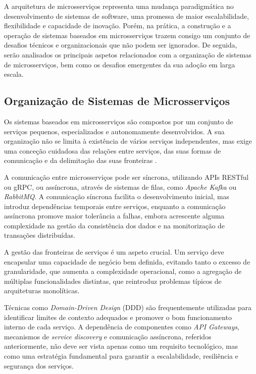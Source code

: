 A arquitetura de microsserviços representa uma mudança paradigmática no desenvolvimento de sistemas de software, uma promessa de maior escalabilidade, flexibilidade e capacidade de inovação. Porém, na prática, a construção e a operação de sistemas baseados em microsserviços trazem consigo um conjunto de desafios técnicos e organizacionais que não podem ser ignorados. De seguida, serão analisados os principais aspetos relacionados com a organização de sistemas de microsserviços, bem como os desafios emergentes da sua adoção em larga escala.

\subsection{Organização de Sistemas de Microsserviços}

Os sistemas baseados em microsserviços são compostos por um conjunto de serviços pequenos, especializados e autonomamente desenvolvidos. A sua organização não se limita à existência de vários serviços independentes, mas exige uma conceção cuidadosa das relações entre serviços, das suas formas de comunicação e da delimitação das suas fronteiras \cite{Railic2021,Lewis2014}. 

A comunicação entre microsserviços pode ser síncrona, utilizando APIs RESTful ou gRPC, ou assíncrona, através de sistemas de filas, como \textit{ Apache Kafka} ou \textit{ RabbitMQ}. A comunicação síncrona facilita o desenvolvimento inicial, mas introduz dependências temporais entre serviços, enquanto a comunicação assíncrona promove maior tolerância a falhas, embora acrescente alguma complexidade na gestão da consistência dos dados e na monitorização de transações distribuídas.

A gestão das fronteiras de serviços é um aspeto crucial. Um serviço deve encapsular uma capacidade de negócio bem definida, evitando tanto o excesso de granularidade, que aumenta a complexidade operacional, como a agregação de múltiplas funcionalidades distintas, que reintroduz problemas típicos de arquiteturas monolíticas.

Técnicas como \textit{Domain-Driven Design} (DDD) \cite{Rogers2022} são frequentemente utilizadas para identificar limites de contexto adequados e promover o bom funcionamento interno de cada serviço. A dependência de componentes como \textit{ API Gateways}, mecanismos de \textit{service discovery} e comunicação assíncrona, referidos anteriormente, não deve ser vista apenas como um requisito tecnológico, mas como uma estratégia fundamental para garantir a escalabilidade, resiliência e segurança dos serviços.

